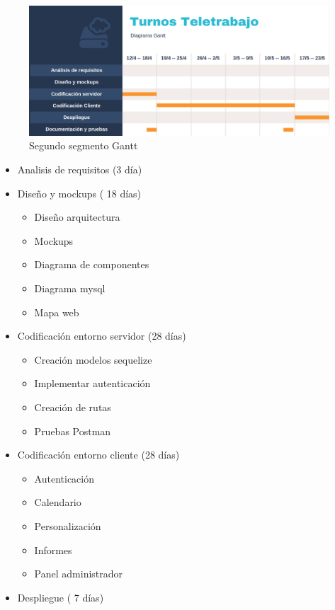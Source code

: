 \documentclass[11pt,spanish,listoffigures,listoftables]{tfgetsinf}
\begin{document}
 \begin{figure}[h!] %
   \includegraphics[width=\linewidth]{img/gantt2.png}
   \caption{Segundo segmento Gantt}
   \label{fig:Gantt21}
 \end{figure}

\begin{itemize}
   \item Analisis de requisitos  (3 día)  
   \item Diseño y mockups ( 18 días)
   \begin{itemize}
      \item Diseño arquitectura
      \item Mockups
      \item Diagrama de componentes
      \item Diagrama mysql
      \item Mapa web
   \end{itemize}
   \item Codificación entorno servidor (28 días)
   \begin{itemize}
      \item Creación modelos sequelize
      \item Implementar autenticación
      \item Creación de rutas
      \item Pruebas Postman
   \end{itemize}
   \item Codificación entorno cliente (28 días)
   \begin{itemize}
      \item Autenticación
      \item Calendario
      \item Personalización
      \item Informes
      \item Panel administrador
   \end{itemize}
   \item Despliegue ( 7 días)

\end{itemize}
\end{document}
